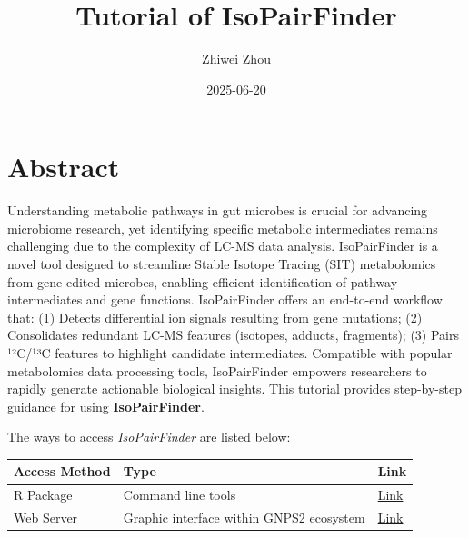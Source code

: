 \documentclass[
  letterpaper,
  DIV=11,
  numbers=noendperiod]{scrreprt}
\title{Tutorial of IsoPairFinder}
\author{Zhiwei Zhou}
\date{2025-06-20}
\renewcommand*\contentsname{Table of contents}
\newcommand\contentsname{Table of contents}
\begin{document}
\maketitle

\renewcommand*\contentsname{Table of contents}
{
\hypersetup{linkcolor=}
\setcounter{tocdepth}{2}
\tableofcontents
}


\chapter*{Abstract}\label{abstract}


Understanding metabolic pathways in gut microbes is crucial for
advancing microbiome research, yet identifying specific metabolic
intermediates remains challenging due to the complexity of LC-MS data
analysis. IsoPairFinder is a novel tool designed to streamline Stable
Isotope Tracing (SIT) metabolomics from gene-edited microbes, enabling
efficient identification of pathway intermediates and gene functions.
IsoPairFinder offers an end-to-end workflow that: (1) Detects
differential ion signals resulting from gene mutations; (2) Consolidates
redundant LC-MS features (isotopes, adducts, fragments); (3) Pairs
¹²C/¹³C features to highlight candidate intermediates. Compatible with
popular metabolomics data processing tools, IsoPairFinder empowers
researchers to rapidly generate actionable biological insights. This
tutorial provides step-by-step guidance for using
\textbf{IsoPairFinder}.

The ways to access \emph{IsoPairFinder} are listed below:

\begin{longtable}[]{@{}
  >{\raggedright\arraybackslash}p{}
  >{\raggedright\arraybackslash}p{}
  >{\raggedright\arraybackslash}p{}@{}}
\toprule\noalign{}
\begin{minipage}[b]{\linewidth}\raggedright
Access Method
\end{minipage} & \begin{minipage}[b]{\linewidth}\raggedright
Type
\end{minipage} & \begin{minipage}[b]{\linewidth}\raggedright
Link
\end{minipage} \\
\midrule\noalign{}
\endhead
\bottomrule\noalign{}
\endlastfoot
R Package & Command line tools &
\href{https://github.com/DoddLab/IsoPairFinder}{Link} \\
Web Server & Graphic interface within GNPS2 ecosystem &
\href{https://gnps2.org/workflowinput?workflowname=isopairspec_nextflow_workflow}{Link} \\
\end{longtable}
\end{document}

